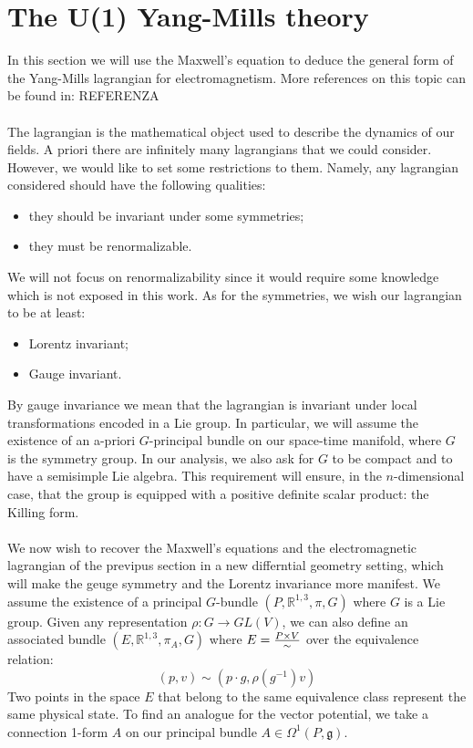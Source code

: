 \documentclass[12pt,a4paper]{report}
\theoremstyle{definition}
\theoremstyle{Theorem}
\theoremstyle{definition}
\theoremstyle{definition}
\begin{document}
	\section{The U(1) Yang-Mills theory}
	In this section we will use the Maxwell's equation to deduce the general form of the Yang-Mills lagrangian for electromagnetism. More references on this topic can be found in: REFERENZA
	\\\\
	The lagrangian is the mathematical object used to describe the dynamics of our fields. A priori there are infinitely many lagrangians that we could consider. However, we would like to set some restrictions to them. Namely, any lagrangian considered should have the following qualities:
	\begin{itemize}
		\item they should be invariant under some symmetries;
		\item they must be renormalizable.
	\end{itemize}
	We will not focus on renormalizability since it would require some knowledge which is not exposed in this work. As for the symmetries, we wish our lagrangian to be at least:
	\begin{itemize}
		\item Lorentz invariant;
		\item Gauge invariant.
	\end{itemize}
	By gauge invariance we mean that the lagrangian is invariant under local transformations encoded in a Lie group. In particular, we will assume the existence of an a-priori $G$-principal bundle on our space-time manifold, where $G$ is the symmetry group. In our analysis, we also ask for $G$ to be compact and to have a semisimple Lie algebra. This requirement will ensure, in the $n$-dimensional case, that the group is equipped with a positive definite scalar product: the Killing form.
	\\\\
	We now wish to recover the Maxwell's equations and the electromagnetic lagrangian of the previpus section in a new differntial geometry setting, which will make the geuge symmetry and the Lorentz invariance more manifest. We assume the existence of a principal $G$-bundle $(P,\mathbb{R}^{1,3},\pi,G)$ where $G$ is a Lie group. Given any representation $\rho:G\rightarrow GL(V)$, we can also define an associated bundle $(E,\mathbb{R}^{1,3},\pi_A,G)$ where $E={P\times V\over \sim}$ over the equivalence relation:
	$$(p,v)\sim(p\cdot g,\rho(g^{-1})v)$$
	Two points in the space $E$ that belong to the same equivalence class represent the same  physical state. To find an analogue for the vector potential, we take a connection 1-form $A$ on our principal bundle $A\in\Omega^1(P,\mathfrak{g})$.\\
\end{document}
